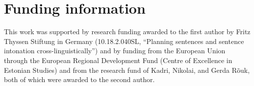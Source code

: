 \documentclass[output=paper]{langscibook}
\begin{document}
\section*{Funding information}
This work was supported by research funding awarded to the first author by Fritz Thyssen Stiftung in Germany (10.18.2.040SL, “Planning sentences and sentence intonation cross-linguistically”) and by funding from the European Union through the European Regional Development Fund (Centre of Excellence in Estonian Studies) and from the research fund of Kadri, Nikolai, and Gerda Rõuk, both of which were awarded to the second author.

\printbibliography[heading=subbibliography,notkeyword=this]
\end{document}
